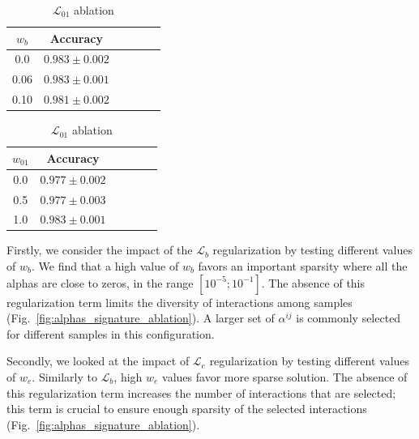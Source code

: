 \documentclass[../main.tex]{subfiles}
\begin{document}
\begin{table}[htbp]
\begin{subtable}[h]{0.2\textwidth}
\begin{tabular}{cccccc}
                 \toprule
                 \(w_{b}\) & Accuracy            \\
                 \midrule
                 0.0       & \(0.983 \pm 0.002\) \\
                 0.06      & \(0.983 \pm 0.001\) \\
                 0.10      & \(0.981 \pm 0.002\) \\
                 \bottomrule
             \end{tabular}
             \label{tab:ablation_wb}
         \end{subtable}
         \hfill
         \begin{subtable}[h]{0.2\textwidth}
             \centering
             \caption{\(\mathcal{L}_{01}\) ablation}
             \begin{tabular}{cccccc}
                 \toprule
                 \(w_{01}\) & Accuracy            \\
                 \midrule
                 0.0        & \(0.977 \pm 0.002\) \\
                 0.5        & \(0.977 \pm 0.003\) \\
                 1.0        & \(0.983 \pm 0.001\) \\
                 \bottomrule
             \end{tabular}
             \label{tab:ablation_w01}
         \end{subtable}
         \label{tab:ablation}
     \end{table}

     Firstly, we consider the impact of the \(\mathcal{L}_b\) regularization by testing different values of \(w_b\).
     We find that a high value of \(w_b\) favors an important sparsity where all the alphas are close to zeros, in the range \(\left[10^{-5}; 10^{-1}\right]\).
     The absence of this regularization term limits the diversity of interactions among samples (Fig.~\ref{fig:alphas_signature_ablation}).
     A larger set of \(\alpha^{ij}\) is commonly selected for different samples in this configuration.

     Secondly, we looked at the impact of \(\mathcal{L}_e\) regularization by testing different values of \(w_e\).
     Similarly to \(\mathcal{L}_b\), high \(w_e\) values favor more sparse solution.
     The absence of this regularization term increases the number of interactions that are selected; this term is crucial to ensure enough sparsity of the selected interactions (Fig.~\ref{fig:alphas_signature_ablation}).
\end{document}
